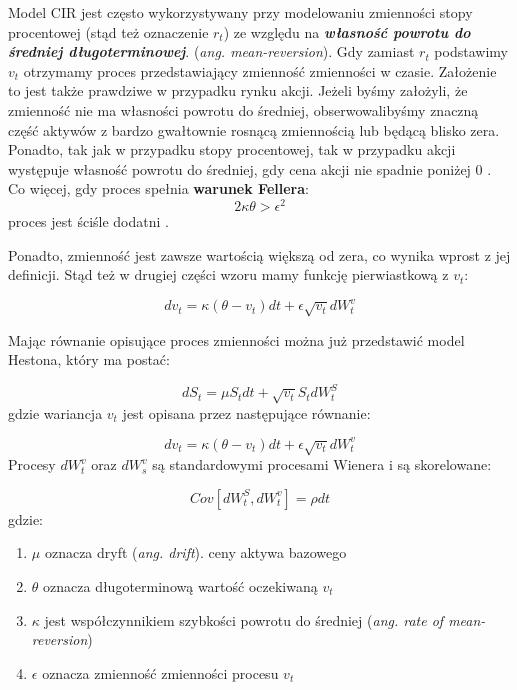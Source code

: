 \documentclass{pracamgr}
\begin{document}
Model CIR jest często wykorzystywany przy modelowaniu zmienności stopy procentowej (stąd też oznaczenie $r_t$) ze względu na \textbf{\textit{własność powrotu do średniej długoterminowej}}. 
(\textit{ang. mean-reversion}). Gdy zamiast $r_t$ podstawimy $v_t$ otrzymamy proces przedstawiający zmienność zmienności w czasie. Założenie to jest także prawdziwe w przypadku rynku 
akcji. Jeżeli byśmy założyli, że zmienność nie ma własności powrotu do średniej, obserwowalibyśmy znaczną część aktywów z bardzo gwałtownie rosnącą zmiennością lub będącą blisko zera.
Ponadto, tak jak w przypadku stopy procentowej, tak w przypadku akcji występuje własność powrotu do średniej, gdy cena akcji nie spadnie poniżej 0  \cite{TestingMeanReversion}.
Co więcej, gdy proces spełnia \textbf{warunek Fellera}:
\begin{equation}
2 \kappa \theta > \epsilon^2
\end{equation}
proces jest ściśle dodatni  \cite{TheLittleHestonTrap}.


Ponadto, zmienność jest zawsze wartością większą od zera, co wynika wprost z jej definicji. Stąd też w drugiej części wzoru mamy funkcję pierwiastkową z $v_t$: 

\begin{equation} 
dv_t  = \kappa (\theta - v_t)dt + \epsilon \sqrt{v_t} dW_t^v 
\end{equation}

Mając równanie opisujące proces zmienności można już przedstawić model Hestona, który ma postać:

\begin{equation}
dS_t  = \mu S_t dt + \sqrt{v_t} S_t dW^S_t
\end{equation}
gdzie wariancja $v_t$ jest opisana przez następujące równanie: 

\begin{equation}
dv_t  = \kappa (\theta - v_t)dt + \epsilon \sqrt{v_t} dW_t^v 
\end{equation}
Procesy $dW_t^v$ oraz $dW_s^v$ są standardowymi procesami Wienera i są skorelowane:

\begin{equation}
Cov[dW^S_t, dW^v_t] = \rho dt 
\end{equation}
gdzie:

\begin{enumerate}
\item $\mu$ oznacza dryft (\textit{ang. drift}). ceny aktywa bazowego 
\item $\theta$ oznacza długoterminową wartość oczekiwaną $v_t$
\item $\kappa$ jest współczynnikiem szybkości powrotu do średniej (\textit{ang. rate of mean-reversion})
\item $\epsilon$ oznacza zmienność zmienności procesu $v_t$
\end{enumerate}
\end{document}
